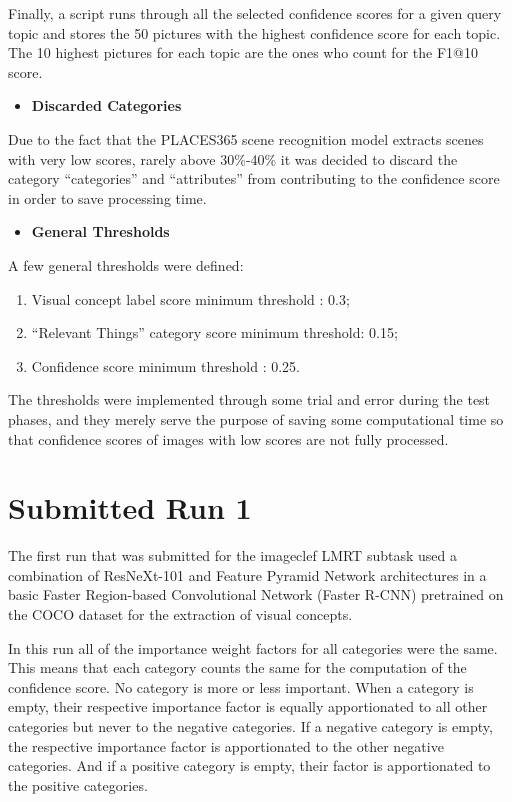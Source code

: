     Finally, a script runs through all the selected confidence scores for a given
    query topic and stores the 50 pictures with the highest confidence score for each topic. The 10 highest pictures for each topic are the ones who count for the F1@10 score.
       
    \begin{itemize}
      \item \textbf{Discarded Categories}
    \end{itemize}
    
    Due to the fact that the PLACES365 scene recognition model extracts scenes with very low scores, rarely above 30\%-40\% it was decided to discard the category \enquote{categories} and \enquote{attributes} from contributing to the confidence score in order to save processing time.

   \newpage
    \begin{itemize}
      \item \textbf{General Thresholds}
    \end{itemize}

    A few general thresholds were defined:

   \begin{enumerate}
    \item Visual concept label score minimum threshold : 0.3;
    \item \enquote{Relevant Things} category score  minimum threshold: 0.15;
    \item Confidence score minimum threshold  : 0.25.
   \end{enumerate}


   The thresholds were implemented through some trial and error during the test phases, and they merely serve the purpose of saving some computational time so that confidence scores of images with low scores are not fully processed. 



    \section{Submitted Run 1}
      \label{sec:run1}

    The first run that was submitted for the imageclef LMRT subtask used a combination of ResNeXt-101 and Feature Pyramid Network architectures in a basic Faster Region-based Convolutional Network (Faster R-CNN) pretrained on the COCO dataset for the extraction of visual concepts.

    In this run all of the importance weight factors for all categories were the same. This means that each category counts the same for the computation of the confidence score. No category is more or less important. When a category is empty, their respective importance factor is equally apportionated to all other categories but never to the negative categories. If a negative category is empty, the respective importance factor is apportionated to the other negative categories. And if a positive category is empty, their factor is apportionated to the positive categories.

